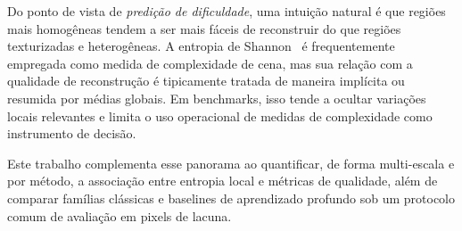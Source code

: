 Do ponto de vista de \emph{predição de dificuldade}, uma intuição natural é que regiões mais homogêneas tendem a ser mais fáceis de reconstruir do que regiões texturizadas e heterogêneas.
A entropia de Shannon~\cite{shannon1948mathematical} é frequentemente empregada como medida de complexidade de cena, mas sua relação com a qualidade de reconstrução é tipicamente tratada de maneira implícita ou resumida por médias globais.
Em benchmarks, isso tende a ocultar variações locais relevantes e limita o uso operacional de medidas de complexidade como instrumento de decisão.

Este trabalho complementa esse panorama ao quantificar, de forma multi-escala e por método, a associação entre entropia local e métricas de qualidade, além de comparar famílias clássicas e baselines de aprendizado profundo sob um protocolo comum de avaliação em pixels de lacuna.
